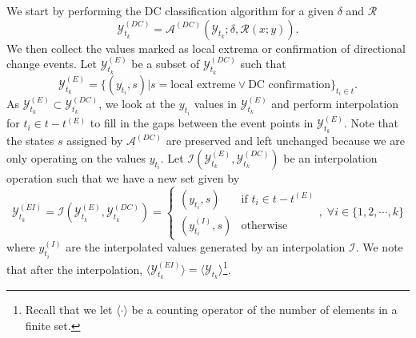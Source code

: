 We start by performing the DC classification algorithm for a given $\delta$ and $\mathcal{R}$
\begin{equation*}
    \mathcal{Y}^{(DC)}_{t_k} = \mathcal{A}^{(DC)} (\mathcal{Y}_{t_k}; \delta, \mathcal{R} (x; y)).
\end{equation*}
We then collect the values marked as local extrema or confirmation of directional change events. Let $\mathcal{Y}^{(E)}_{t_k}$ be a subset of $\mathcal{Y}^{(DC)}_{t_k}$ such that
\begin{equation*}
    \mathcal{Y}^{(E)}_{t_k} = \{(y_{t_i}, s) | s = \text{local extreme} \vee \text{DC confirmation} \}_{t_i \in t}.
\end{equation*}
As $\mathcal{Y}^{(E)}_{t_k} \subset \mathcal{Y}^{(DC)}_{t_k}$, we look at the $y_{t_i}$ values in $\mathcal{Y}^{(E)}_{t_k}$ and perform interpolation for $t_i \in t - t^{(E)}$ to fill in the gaps between the event points in $\mathcal{Y}^{(E)}_{t_k}$. Note that the states $s$ assigned by $\mathcal{A}^{(DC)}$ are preserved and left unchanged because we are only operating on the values $y_{t_i}$. Let $\mathcal{I} (\mathcal{Y}^{(E)}_{t_k}, \mathcal{Y}^{(DC)}_{t_k})$ be an interpolation operation such that we have a new set given by
\begin{equation*}
    \mathcal{Y}^{(EI)}_{t_k} = \mathcal{I} (\mathcal{Y}^{(E)}_{t_k}, \mathcal{Y}^{(DC)}_{t_k}) = \begin{cases}
        (y_{t_i}, s)          &\text{if $t_i \in t - t^{(E)}$} \\
        (y^{(I)}_{t_i}, s)    &\text{otherwise}
    \end{cases}, \; \forall i \in \{1, 2, \cdots, k\}
\end{equation*}
where $y^{(I)}_{t_i}$ are the interpolated values generated by an interpolation $\mathcal{I}$. We note that after the interpolation, $\langle \mathcal{Y}^{(EI)}_{t_k} \rangle = \langle \mathcal{Y}_{t_k} \rangle$\footnote{Recall that we let $\langle \cdot \rangle$ be a counting operator of the number of elements in a finite set.}.

